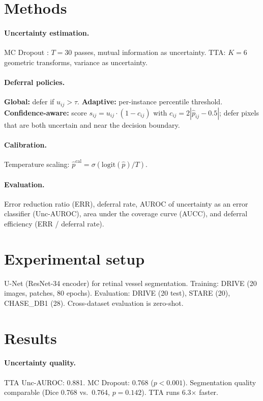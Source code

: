 \documentclass[11pt]{article}
\begin{document}
\section{Methods}

\paragraph{Uncertainty estimation.}
MC Dropout \citep{gal2016dropout}: $T = 30$ passes, mutual information as
uncertainty. TTA: $K = 6$ geometric transforms, variance as uncertainty.

\paragraph{Deferral policies.}
\textbf{Global:} defer if $u_{ij} > \tau$. \textbf{Adaptive:} per-instance
percentile threshold. \textbf{Confidence-aware:} score $s_{ij} = u_{ij} \cdot
(1 - c_{ij})$ with $c_{ij} = 2|\hat{p}_{ij} - 0.5|$; defer pixels that are
both uncertain and near the decision boundary.

\paragraph{Calibration.}
Temperature scaling: $\hat{p}^{\text{cal}} = \sigma(\text{logit}(\hat{p})/T)$.

\paragraph{Evaluation.}
Error reduction ratio (ERR), deferral rate, AUROC of uncertainty as an error
classifier (Unc-AUROC), area under the coverage curve (AUCC), and
deferral efficiency (ERR / deferral rate).

\section{Experimental setup}

U-Net (ResNet-34 encoder) for retinal vessel segmentation. Training: DRIVE
(20 images, patches, 80 epochs). Evaluation: DRIVE (20 test), STARE (20),
CHASE\_DB1 (28). Cross-dataset evaluation is zero-shot.

\section{Results}

\paragraph{Uncertainty quality.}
TTA Unc-AUROC: 0.881. MC Dropout: 0.768 ($p < 0.001$). Segmentation quality
comparable (Dice 0.768 vs.\ 0.764, $p = 0.142$). TTA runs 6.3$\times$
faster.
\end{document}

